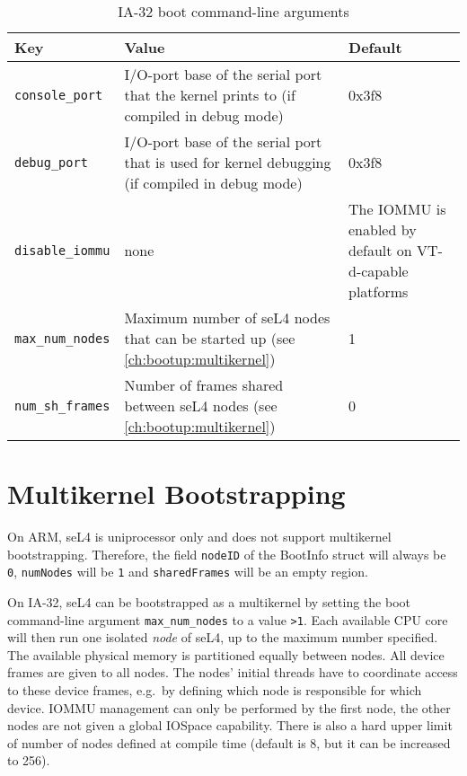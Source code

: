 \begin{table}[htb]
    \caption{IA-32 boot command-line arguments}
        \begin{tabularx}{\textwidth}{lXX}
            \toprule
              Key & Value & Default \\
            \midrule
            \texttt{console\_port} &
            I/O-port base of the serial port that the kernel prints to
            (if compiled in debug mode) &
            0x3f8 \\
            \texttt{debug\_port} &
            I/O-port base of the serial port that is used for kernel debugging
            (if compiled in debug mode) &
            0x3f8 \\
            \texttt{disable\_iommu} &
            none &
            The IOMMU is enabled by default on VT-d-capable platforms \\
            \texttt{max\_num\_nodes} &
            Maximum number of seL4 nodes that can be started up (see \autoref{ch:bootup:multikernel}) &
            1 \\
            \texttt{num\_sh\_frames} &
            Number of frames shared between seL4 nodes (see \autoref{ch:bootup:multikernel}) &
            0 \\
            \bottomrule
        \end{tabularx}
    \label{tab:bootargs}
\end{table}
\fi

\section{\label{ch:bootup:multikernel}Multikernel Bootstrapping}

On ARM, seL4 is uniprocessor only and does not support multikernel
\cite{Baumann_BDHIPRSS_09} bootstrapping. Therefore, the field \texttt{nodeID}
of the BootInfo struct
will always be \texttt{0}, \texttt{numNodes} will be \texttt{1} and
\texttt{sharedFrames} will be an empty region.

\ifxeightsix
On IA-32, seL4 can be bootstrapped as a multikernel
by setting the boot command-line argument \texttt{max\_num\_nodes} to a value
\texttt{>1}.
Each available CPU core will then run one isolated \emph{node} of seL4, up to
the maximum number specified.
The available physical memory is partitioned equally between nodes.
All device frames are given to all nodes. The nodes' initial threads have to
coordinate access to these device frames, e.g.\ by defining which node is
responsible for which device.
IOMMU management can only be performed by the first node, the other nodes
are not given a global IOSpace capability. 
There is also a hard upper limit of number of nodes defined at compile time
(default is 8, but it can be increased to 256).

